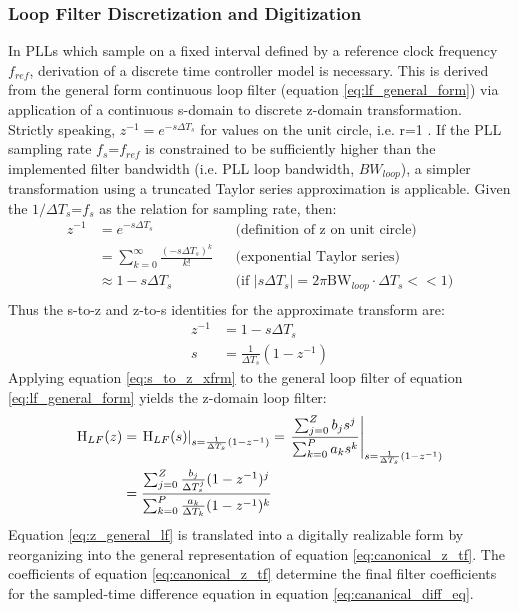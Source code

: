 		\subsubsection{Loop Filter Discretization and Digitization}\label{lf-discretization}
			In PLLs which sample on a fixed interval defined by a reference clock frequency $f_{ref}$, derivation of a discrete time controller model is necessary. This is derived from the general form continuous loop filter (equation \ref{eq:lf_general_form}) via application of a continuous s-domain to discrete z-domain transformation. Strictly speaking, $z^{-1} = e^{-s\Delta T_s}$ for values on the unit circle, i.e. r=1 \cite{proakis_1993_z}. If the PLL sampling rate $f_s$=$f_{ref}$ is constrained to be sufficiently higher than the implemented filter bandwidth (i.e. PLL loop bandwidth, $BW_{loop}$), a simpler transformation using a truncated Taylor series approximation is applicable. Given the $1/\Delta T_s$=$f_{s}$ as the relation for sampling rate, then:
			\begin{align*}
				z^{-1} &= e^{-s\Delta T_s} && \text{(definition of z on unit circle)} \\
				&= \sum_{k=0}^\infty\frac{(-s\Delta T_s)^k}{k!} && \text{(exponential Taylor series)} \\
				&\approx 1-s\Delta T_s &&\text{(if $|s\Delta T_s| = 2\pi\mathrm{BW}_{loop}\cdot \Delta T_s << 1$)} \\
			\end{align*}
			Thus the s-to-z and z-to-s identities for the approximate transform are:
			\begin{align}
				z^{-1} &= 1-s\Delta T_s\\
				s &= \frac{1}{\Delta T_s}(1-z^{-1}) \label{eq:s_to_z_xfrm}
			\end{align}
			Applying equation \ref{eq:s_to_z_xfrm} to the general loop filter of equation \ref{eq:lf_general_form} yields the z-domain loop filter:
			\begin{align}
				\textnormal{H}_{LF}(z) &= \left.\textnormal{H}_{LF}(s)\right\vert_{s=\frac{1}{\Delta T_s}(1-z^{-1})} = \left.\frac{\sum_{j=0}^Z b_js^j}{\sum_{k=0}^P a_ks^k}\right\vert_{s=\frac{1}{\Delta T_s}(1-z^{-1})}\\
				&= \frac{\sum_{j=0}^Z \frac{b_j}{\Delta T_s^j}(1-z^{-1})^j}{\sum_{k=0}^P \frac{a_k}{\Delta T_k}(1-z^{-1})^k} \label{eq:z_general_lf}
			\end{align}
			Equation \ref{eq:z_general_lf} is translated into a digitally realizable form by reorganizing into the general representation of equation \ref{eq:canonical_z_tf}. The coefficients of equation \ref{eq:canonical_z_tf} determine the final filter coefficients for the sampled-time difference equation in equation \ref{eq:cananical_diff_eq}. 
